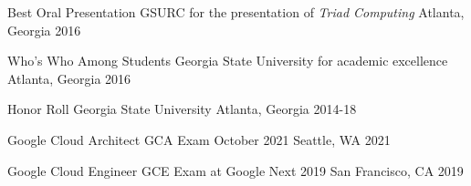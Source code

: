 




\begin{cvhonors}


\cvhonor
{Best Oral Presentation} %
{GSURC for the presentation of \em{Triad Computing}} %
{Atlanta, Georgia} %
{2016} %


\cvhonor
{Who's Who Among Students} %
{Georgia State University for academic excellence} %
{Atlanta, Georgia} %
{2016} %


\cvhonor
{Honor Roll} %
{Georgia State University} %
{Atlanta, Georgia} %
{2014-18} %


\end{cvhonors}




\begin{cvhonors}


\cvhonor
{Google Cloud Architect} %
{GCA Exam October 2021} %
{Seattle, WA} %
{2021} %


\cvhonor
{Google Cloud Engineer} %
{GCE Exam at Google Next 2019} %
{San Francisco, CA} %
{2019} %


\end{cvhonors}

